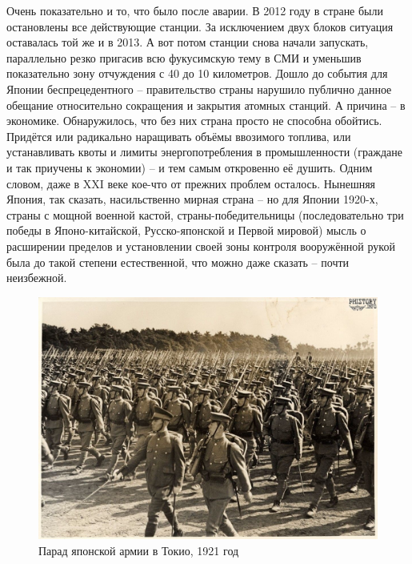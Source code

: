 Очень показательно и то, что было после аварии. В 2012 году в стране были остановлены все действующие станции. За исключением двух блоков ситуация оставалась той же и в 2013. А вот потом станции снова начали запускать, параллельно резко пригасив всю фукусимскую тему в СМИ и уменьшив показательно зону отчуждения с 40 до 10 километров. Дошло до события для Японии беспрецедентного – правительство страны нарушило публично данное обещание относительно сокращения и закрытия атомных станций. А причина – в экономике. Обнаружилось, что без них страна просто не способна обойтись. Придётся или радикально наращивать объёмы ввозимого топлива, или устанавливать квоты и лимиты энергопотребления в промышленности (граждане и так приучены к экономии) – и тем самым откровенно её душить. Одним словом, даже в XXI веке кое-что от прежних проблем осталось.
Нынешняя Япония, так сказать, насильственно мирная страна – но для Японии 1920-х, страны с мощной военной кастой, страны-победительницы (последовательно три победы в Японо-китайской, Русско-японской и Первой мировой) мысль о расширении пределов и установлении своей зоны контроля вооружённой рукой была до такой степени естественной, что можно даже сказать – почти неизбежной. 

\begin{figure}[h!tb] 
	\centering\includegraphics[scale=0.4]{Glava1/_4PjKKM4HkA.jpg}
	\caption{Парад японской армии в Токио, 1921 год}%
\end{figure}

